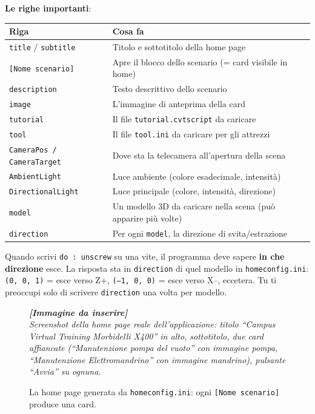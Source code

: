 ﻿\documentclass[a4paper,12pt,oneside]{book}
\newcommand{\kw}[1]{\texttt{\color{keycolor}#1}}
\newcommand{\val}[1]{\texttt{\color{cvtgreen}#1}}
\newcommand{\file}[1]{\texttt{#1}}
\newcommand{\imgph}[2]{%
  \begin{tcolorbox}[colback=cvtlightblue!30,colframe=cvtblue!40,%
    width=#1,halign=center,valign=center,height=5cm,boxrule=0.5pt,arc=3pt]%
    \textcolor{cvtgray}{\itshape\footnotesize\textbf{[Immagine da inserire]}\\[3pt]#2}%
  \end{tcolorbox}}
\begin{document}
\textbf{Le righe importanti}:

\begin{longtable}{@{}lp{9cm}@{}}
\toprule
\textbf{Riga} & \textbf{Cosa fa} \\
\midrule
\val{title} / \val{subtitle} & Titolo e sottotitolo della home page \\
\val{[Nome scenario]} & Apre il blocco dello scenario (= card visibile in home) \\
\val{description} & Testo descrittivo dello scenario \\
\val{image} & L'immagine di anteprima della card \\
\val{tutorial} & Il file \file{tutorial.cvtscript} da caricare \\
\val{tool} & Il file \file{tool.ini} da caricare per gli attrezzi \\
\val{CameraPos / CameraTarget} & Dove sta la telecamera all'apertura della scena \\
\val{AmbientLight} & Luce ambiente (colore esadecimale, intensità) \\
\val{DirectionalLight} & Luce principale (colore, intensità, direzione) \\
\val{model} & Un modello 3D da caricare nella scena (può apparire più volte) \\
\val{direction} & Per ogni \texttt{model}, la direzione di svita/estrazione \\
\bottomrule
\end{longtable}

\begin{notablu}
Quando scrivi \texttt{do : unscrew} su una vite, il programma deve sapere
\textbf{in che direzione} esce. La risposta sta in \kw{direction} di quel
modello in \file{homeconfig.ini}: \texttt{(0, 0, 1)} = esce verso Z+,
\texttt{(--1, 0, 0)} = esce verso X--, eccetera. Tu ti preoccupi solo di scrivere
\texttt{direction} una volta per modello.
\end{notablu}

\begin{figure}[H]
  \centering
  \imgph{12cm}{Screenshot della home page reale dell'applicazione: titolo ``Campus Virtual Training Morbidelli X400'' in alto, sottotitolo, due card affiancate (``Manutenzione pompa del vuoto'' con immagine pompa, ``Manutenzione Elettromandrino'' con immagine mandrino), pulsante ``Avvia'' su ognuna.}
  \caption{La home page generata da \file{homeconfig.ini}: ogni \texttt{[Nome scenario]} produce una card.}
  \label{fig:home-page-app}
\end{figure}
\end{document}
